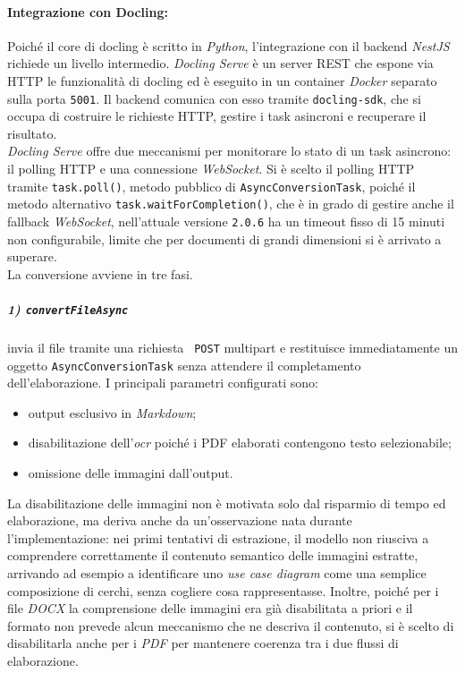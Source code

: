 \paragraph{Integrazione con Docling:}
Poiché il core di \gls{docling} è scritto in \emph{Python}, l'integrazione con il backend \emph{NestJS} richiede un livello intermedio. \emph{Docling Serve} è un server REST che espone via HTTP le funzionalità di \gls{docling} ed è eseguito in un container \emph{Docker} separato sulla porta \texttt{5001}. Il backend comunica con esso tramite \texttt{docling-sdk}, che si occupa di costruire le richieste HTTP, gestire i task asincroni e recuperare il risultato.\\

\emph{Docling Serve} offre due meccanismi per monitorare lo stato di un task asincrono: il polling HTTP e una connessione \emph{WebSocket}. Si è scelto il polling HTTP tramite \texttt{task.poll()}, metodo pubblico di \texttt{AsyncConversionTask}, poiché il metodo alternativo \texttt{task.waitForCompletion()}, che è in grado di gestire anche il fallback \emph{WebSocket}, nell'attuale versione \texttt{2.0.6} ha un timeout fisso di 15 minuti non configurabile, limite che per documenti di grandi dimensioni si è arrivato a superare.\\

La conversione avviene in tre fasi.

\subparagraph{1) \texttt{convertFileAsync}} invia il file tramite una richiesta \texttt{ POST} multipart e restituisce immediatamente un oggetto \texttt{AsyncConversionTask} senza attendere il completamento dell'elaborazione. I principali parametri configurati sono:
\begin{itemize}
    \item output esclusivo in \emph{Markdown};
    \item disabilitazione dell'\emph{\gls{ocr}\glsfirstoccur} poiché i PDF elaborati contengono testo selezionabile;
    \item omissione delle immagini dall'output.
\end{itemize}

La disabilitazione delle immagini non è motivata solo dal risparmio di tempo ed elaborazione, ma deriva anche da un'osservazione nata durante l'implementazione: nei primi tentativi di estrazione, il modello non riusciva a comprendere correttamente il contenuto semantico delle immagini estratte, arrivando ad esempio a identificare uno \emph{use case diagram} come una semplice composizione di cerchi, senza cogliere cosa rappresentasse. Inoltre, poiché per i file \emph{DOCX} la comprensione delle immagini era già disabilitata a priori e il formato non prevede alcun meccanismo che ne descriva il contenuto, si è scelto di disabilitarla anche per i \emph{PDF} per mantenere coerenza tra i due flussi di elaborazione.

